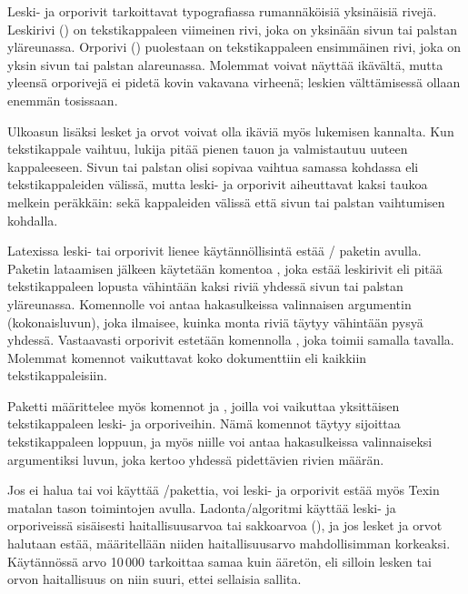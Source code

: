 Leski- ja orporivit tarkoittavat typografiassa rumannäköisiä yksinäisiä
rivejä. Leskirivi () on tekstikappaleen viimeinen rivi,
joka on yksinään sivun tai palstan yläreunassa. Orporivi
() puolestaan on tekstikappaleen ensimmäinen rivi, joka
on yksin sivun tai palstan alareunassa. Molemmat voivat näyttää
ikävältä, mutta yleensä orporivejä ei pidetä kovin vakavana virheenä;
leskien välttämisessä ollaan enemmän tosissaan.

Ulkoasun lisäksi lesket ja orvot voivat olla ikäviä myös lukemisen
kannalta. Kun tekstikappale vaihtuu, lukija pitää pienen tauon ja
valmistautuu uuteen kappaleeseen. Sivun tai palstan olisi sopivaa
vaihtua samassa kohdassa eli tekstikappaleiden välissä, mutta leski- ja
orporivit aiheuttavat kaksi taukoa melkein peräkkäin: sekä kappaleiden
välissä että sivun tai palstan vaihtumisen kohdalla.

Latexissa leski- tai orporivit lienee käytännöllisintä estää
\-/ paketin avulla. Paketin lataamisen jälkeen
käytetään komentoa , joka estää leskirivit eli
pitää tekstikappaleen lopusta vähintään kaksi riviä yhdessä sivun tai
palstan yläreunassa. Komennolle voi antaa hakasulkeissa valinnaisen
argumentin (kokonaisluvun), joka ilmaisee, kuinka monta riviä täytyy
vähintään pysyä yhdessä. Vastaavasti orporivit estetään komennolla
, joka toimii samalla tavalla. Molemmat komennot
vaikuttavat koko dokumenttiin eli kaikkiin tekstikappaleisiin.

\begin{koodilohkosis}
\usepackage{nowidow}
\setnowidow                %
\setnoclub                 %
\usepackage[all]{nowidow}  %
\end{koodilohkosis}

\noindent
Paketti  määrittelee myös komennot 
ja , joilla voi vaikuttaa yksittäisen tekstikappaleen
leski- ja orporiveihin. Nämä komennot täytyy sijoittaa tekstikappaleen
loppuun, ja myös niille voi antaa hakasulkeissa valinnaiseksi
argumentiksi luvun, joka kertoo yhdessä pidettävien rivien määrän.

Jos ei halua tai voi käyttää \-/pakettia, voi leski- ja
orporivit estää myös Texin matalan tason toimintojen avulla.
Ladonta\-/algoritmi käyttää leski- ja orporiveissä sisäisesti
haitallisuusarvoa tai sakkoarvoa (), ja jos lesket ja
orvot halutaan estää, määritellään niiden haitallisuusarvo
mahdollisimman korkeaksi. Käytännössä arvo 10\,000 tarkoittaa samaa kuin
ääretön, eli silloin lesken tai orvon haitallisuus on niin suuri, ettei
sellaisia sallita.

